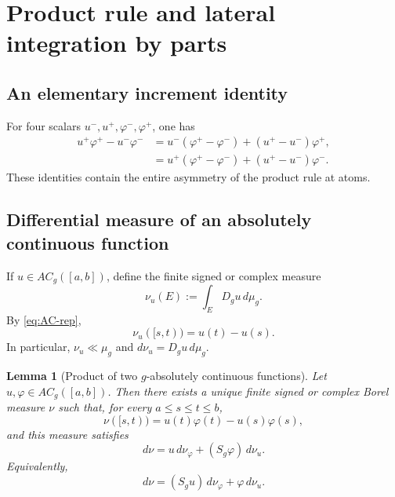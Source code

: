 \documentclass[preprint,12pt]{elsarticle}
\newtheorem{lemma}[theorem]{Lemma}
\theoremstyle{definition}
\theoremstyle{remark}
\newcommand{\mug}{\mu_g}
\newcommand{\ACg}{AC_g}
\begin{document}
\section{Product rule and lateral integration by parts}\label{sec:ibp}

\subsection{An elementary increment identity}

For four scalars $u^-,u^+,\varphi^-,\varphi^+$, one has
\begin{align}
 u^+\varphi^+-u^-\varphi^-
 &=u^-(\varphi^+-\varphi^-)+(u^+-u^-)\varphi^+,
 \label{eq:finite-product-left}\\
 &=u^+(\varphi^+-\varphi^-)+(u^+-u^-)\varphi^-.
 \label{eq:finite-product-right}
\end{align}
These identities contain the entire asymmetry of the product rule at atoms.

\subsection{Differential measure of an absolutely continuous function}

If $u\in\ACg([a,b])$, define the finite signed or complex measure
\[
 \nu_u(E):=\int_E D_gu\,d\mug.
\]
By \eqref{eq:AC-rep},
\begin{equation}\label{eq:nu-u-interval}
 \nu_u([s,t))=u(t)-u(s).
\end{equation}
In particular, $\nu_u\ll\mug$ and $d\nu_u=D_gu\,d\mug$.

\begin{lemma}[Product of two $g$-absolutely continuous functions]\label{lem:product-measure}
Let $u,\varphi\in\ACg([a,b])$. Then there exists a unique finite signed or complex Borel measure $\nu$ such that, for every $a\le s\le t\le b$,
\[
 \nu([s,t))=u(t)\varphi(t)-u(s)\varphi(s),
\]
and this measure satisfies
\begin{equation}\label{eq:product-measure}
 d\nu=u\,d\nu_\varphi+(S_g\varphi)\,d\nu_u.
\end{equation}
Equivalently,
\begin{equation}\label{eq:product-measure-2}
 d\nu=(S_gu)\,d\nu_\varphi+\varphi\,d\nu_u.
\end{equation}
\end{lemma}
\end{document}
